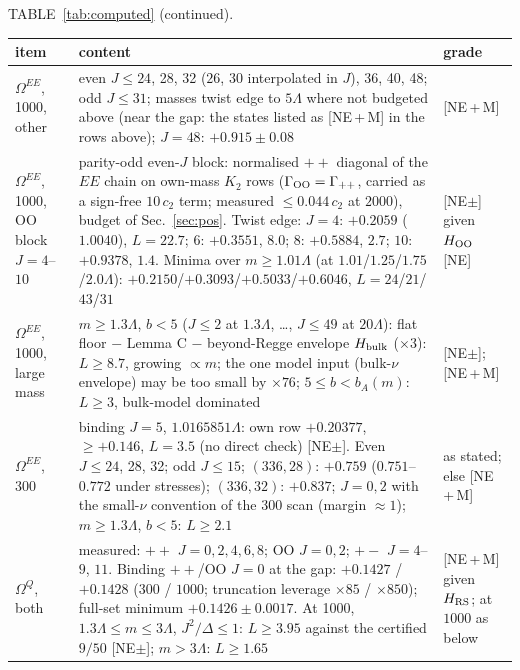 \documentclass[aps,prl,onecolumn,superscriptaddress,nofootinbib]{revtex4-2}
\begin{document}
\begin{table}[!htbp]
\footnotesize
\centering TABLE~\ref{tab:computed} (continued).\par\smallskip
\begin{ruledtabular}
\begin{tabular}{L{3.0cm}L{10.8cm}L{2.4cm}}
item & content & grade\\\hline
$\Omega^{EE}$, 1000, other & even $J\le24$, 28, 32 ($26$, $30$ interpolated in $J$), 36, 40, 48; odd $J\le31$; masses twist edge to $5\Lambda$ where not budgeted above (near the gap: the states listed as [NE\,+\,M] in the rows above); $J=48$: $+0.915\pm0.08$ & [NE\,+\,M]\\
$\Omega^{EE}$, 1000, OO block $J=4$--$10$ & parity-odd even-$J$ block: normalised $++$ diagonal of the $EE$ chain on own-mass $K_2$ rows ($\Gamma_{\rm OO}=\Gamma_{++}$, carried as a sign-free $10\,c_2$ term; measured $\le0.044\,c_2$ at $2000$), budget of Sec.~\ref{sec:pos}. Twist edge: $J=4$: $+0.2059$ ($1.0040$), $L=22.7$; $6$: $+0.3551$, $8.0$; $8$: $+0.5884$, $2.7$; $10$: $+0.9378$, $1.4$. Minima over $m\ge1.01\Lambda$ (at $1.01$/$1.25$/$1.75$/$2.0\Lambda$): $+0.2150$/$+0.3093$/$+0.5033$/$+0.6046$, $L=24$/$21$/$43$/$31$ & [NE$\pm$] given $H_{\rm OO}$ [NE]\\
$\Omega^{EE}$, 1000, large mass & $m\ge1.3\Lambda$, $b<5$ ($J\le2$ at $1.3\Lambda$, \dots, $J\le49$ at $20\Lambda$): flat floor $-$ Lemma C $-$ beyond-Regge envelope $H_{\rm bulk}$ ($\times3$): $L\ge8.7$, growing $\propto m$; the one model input (bulk-$\nu$ envelope) may be too small by $\times76$; $5\le b<b_A(m)$: $L\ge3$, bulk-model dominated & [NE$\pm$]; [NE\,+\,M]\\
$\Omega^{EE}$, 300 & binding $J=5$, $1.0165851\Lambda$: own row $+0.20377$, $\ge+0.146$, $L=3.5$ (no direct check) [NE$\pm$]. Even $J\le24$, 28, 32; odd $J\le15$; $(336,28)$: $+0.759$ ($0.751$--$0.772$ under stresses); $(336,32)$: $+0.837$; $J=0,2$ with the small-$\nu$ convention of the $300$ scan (margin $\approx1$); $m\ge1.3\Lambda$, $b<5$: $L\ge2.1$ & as stated; else [NE\,+\,M]\\
$\Omega^Q$, both & measured: $++$ $J=0,2,4,6,8$; OO $J=0,2$; $+-$ $J=4$--$9$, $11$. Binding $++$/OO $J=0$ at the gap: $+0.1427$ / $+0.1428$ ($300$ / $1000$; truncation leverage $\times85$ / $\times850$); full-set minimum $+0.1426\pm0.0017$. At 1000, $1.3\Lambda\le m\le3\Lambda$, $J^2/\Delta\le1$: $L\ge3.95$ against the certified $9/50$ [NE$\pm$]; $m>3\Lambda$: $L\ge1.65$ & [NE\,+\,M] given $H_{\rm RS}$; at $1000$ as below\\

\end{tabular}
\end{ruledtabular}
\end{table}
\end{document}
